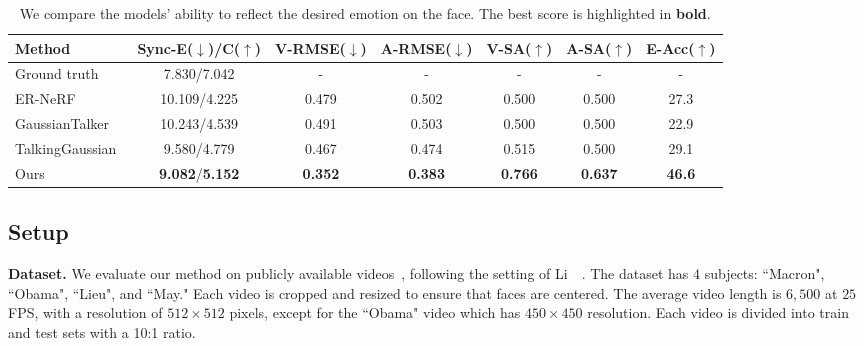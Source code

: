 \begin{table*}[t]
    \centering
    \begin{tabular}{l|cccccc}
    \hline
    Method & Sync-E($\downarrow$)/C($\uparrow$) & V-RMSE($\downarrow$) & A-RMSE($\downarrow$) & V-SA($\uparrow$) & A-SA($\uparrow$) & E-Acc($\uparrow$) \\
    \hline
    Ground truth & 7.830/7.042 & - & - & - & - & -\\
    \hline
    ER-NeRF~\cite{li2023efficient}  & 10.109/4.225 & 0.479 & 0.502 & 0.500 & 0.500 & 27.3 \\
    GaussianTalker~\cite{cho2024gaussiantalker}  & 10.243/4.539 & 0.491 & 0.503 & 0.500 & 0.500 & 22.9 \\
    TalkingGaussian~\cite{li2024talkinggaussian}  & 9.580/4.779 & 0.467 & 0.474 & 0.515 & 0.500 & 29.1 \\
    \hline
    Ours & \textbf{9.082}/\textbf{5.152} & \textbf{0.352} & \textbf{0.383} & \textbf{0.766} & \textbf{0.637} & \textbf{46.6}  \\
    \hline
    \end{tabular}
    \vspace{-3mm}
    \caption{We compare the models' ability to reflect the desired emotion on the face. The best score is highlighted in \textbf{bold}.}
    \label{tab:scenario 3}
    \vspace{-3mm}
\end{table*}

\subsection{Setup}
\noindent\textbf{Dataset.} We evaluate our method on publicly available videos~\cite{guo2021ad,li2023efficient,ye2023geneface}, following the setting of Li~\etal~\cite{li2024talkinggaussian}. The dataset has $4$ subjects: ``Macron", ``Obama", ``Lieu", and ``May." Each video is cropped and resized to ensure that faces are centered. The average video length is $6,500$ at $25$ FPS, with a resolution of $512\times512$ pixels, except for the ``Obama" video which has $450\times450$ resolution. Each video is divided into train and test sets with a 10:1 ratio.

